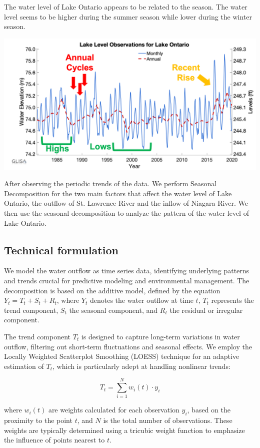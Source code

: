 \documentclass[pre,12pt]{revtex4-1}
\begin{document}
The water level of Lake Ontario appears to be related to the season. The water level seems to be higher during the summer season while lower during the winter season. 

\begin{center}
\includegraphics[width=0.8\linewidth]{img/water_level.png}
\end{center}


  After observing the periodic trends of the data. We perform Seasonal Decomposition for the two main factors that affect the water level of Lake Ontario, the outflow of St. Lawrence River and the inflow of Niagara River. We then use the seasonal decomposition to analyze the pattern of the water level of Lake Ontario. 

\subsection*{Technical formulation}

We model the water outflow as time series data, identifying underlying patterns and trends crucial for predictive modeling and environmental management. The decomposition is based on the additive model, defined by the equation \(Y_t = T_t + S_t + R_t\), where \(Y_t\) denotes the water outflow at time \(t\), \(T_t\) represents the trend component, \(S_t\) the seasonal component, and \(R_t\) the residual or irregular component.


The trend component \(T_t\) is designed to capture long-term variations in water outflow, filtering out short-term fluctuations and seasonal effects. We employ the Locally Weighted Scatterplot Smoothing (LOESS) technique for an adaptive estimation of \(T_t\), which is particularly adept at handling nonlinear trends:

\[ T_t = \sum_{i=1}^{N} w_i(t) \cdot y_i \]

where \(w_i(t)\) are weights calculated for each observation \(y_i\), based on the proximity to the point \(t\), and \(N\) is the total number of observations. These weights are typically determined using a tricubic weight function to emphasize the influence of points nearest to \(t\).
\end{document}
